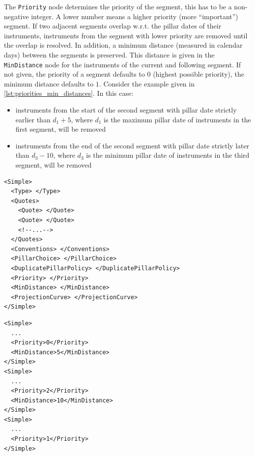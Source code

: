 The \lstinline!Priority! node determines the priority of the segment, this has to be a non-negative integer. A lower
number means a higher priority (more ``important'') segment. If two adjacent segments overlap w.r.t. the pillar dates of
their instruments, instruments from the segment with lower priority are removed until the overlap is resolved. In
addition, a minimum distance (measured in calendar days) between the segments is preserved. This distance is given in
the \lstinline!MinDistance! node for the instruments of the current and following segment. If not given, the priority of
a segment defaults to 0 (highest possible priority), the minimum distance defaults to $1$. Consider the example given in
\ref{lst:priorities_min_distances}. In this case:
\begin{itemize}
\item instruments from the start of the second segment with pillar date strictly earlier than $d_1 + 5$, where $d_1$ is
  the maximum pillar date of instruments in the first segment, will be removed
\item instruments from the end of the second segment with pillar date strictly later than $d_3 - 10$, where $d_3$ is the
  minimum pillar date of instruments in the third segment, will be removed
\end{itemize}


\begin{listing}[H]
\begin{verbatim}
<Simple>
  <Type> </Type>
  <Quotes>
    <Quote> </Quote>
    <Quote> </Quote>
    <!--...-->
  </Quotes>
  <Conventions> </Conventions>
  <PillarChoice> </PillarChoice>
  <DuplicatePillarPolicy> </DuplicatePillarPolicy>
  <Priority> </Priority>
  <MinDistance> </MinDistance>
  <ProjectionCurve> </ProjectionCurve>
</Simple>
\end{verbatim}
\caption{Simple yield curve segment}
\label{lst:simple_segment}
\end{listing}

\begin{listing}[H]
\begin{verbatim}
<Simple>
  ...
  <Priority>0</Priority>
  <MinDistance>5</MinDistance>
</Simple>
<Simple>
  ...
  <Priority>2</Priority>
  <MinDistance>10</MinDistance>
</Simple>
<Simple>
  ...
  <Priority>1</Priority>
</Simple>
\end{verbatim}
\caption{Example for priorities and min distances}
\label{lst:priorities_min_distances}
\end{listing}


